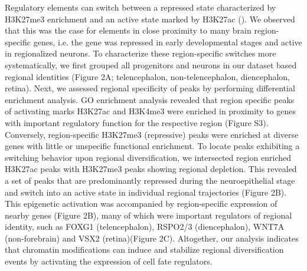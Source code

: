 Regulatory elements can switch between a repressed state characterized by H3K27me3 enrichment and an active state marked by H3K27ac (\cite{allis_molecular_2016}). We observed that this was the case for elements in close proximity to many brain region-specific genes, i.e. the gene was repressed in early developmental stages and active in regionalized neurons. To characterize these region-specific switches more systematically, we first grouped all progenitors and neurons in our dataset based regional identities (Figure 2A; telencephalon, non-telencephalon, diencephalon, retina). Next, we assessed regional specificity of peaks by performing differential enrichment analysis. GO enrichment analysis revealed that region specific peaks of activating marks H3K27ac and H3K4me3 were enriched in proximity to genes with important regulatory function for the respective region (Figure S3). Conversely, region-specific H3K27me3 (repressive) peaks were enriched at diverse genes with little or unspecific functional enrichment. To locate peaks exhibiting a switching behavior upon regional diversification, we intersected region enriched H3K27ac peaks with H3K27me3 peaks showing regional depletion. This revealed a set of peaks that are predominantly repressed during the neuroepithelial stage and switch into an active state in individual regional trajectories (Figure 2B). This epigenetic activation was accompanied by region-specific expression of nearby genes (Figure 2B), many of which were important regulators of regional identity, such as FOXG1 (telencephalon), RSPO2/3 (diencephalon), WNT7A (non-forebrain) and VSX2 (retina)(Figure 2C). Altogether, our analysis indicates that chromatin modifications can induce and stabilize regional diversification events by activating the expression of cell fate regulators.


